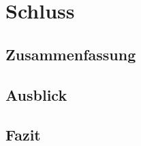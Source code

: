 \chapter{Schluss}
    \label{chapter:SummaryAndOutlook}

    \section{Zusammenfassung}
    \section{Ausblick}
    \section{Fazit}